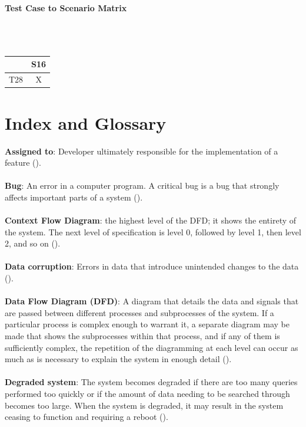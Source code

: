 \documentclass{article}
\begin{document}
\paragraph{Test Case to Scenario Matrix}~\\ \\
\begin{tabular}{ | c || c | }
\hline
    & S16  \\
\hline
\hline
T28 &  X  \\
\hline
\end{tabular}

\section{Index and Glossary}
\textbf{Assigned to}: Developer ultimately responsible for the implementation of a feature (\pageref{feature}).\\ \\
\textbf{Bug}: An error in a computer program. A critical bug is a bug that strongly affects important parts of a system (\pageref{bug}).\\ \\
\textbf{Context Flow Diagram}: the highest level of the DFD; it shows the entirety of the system. The next level of specification is level 0, followed by level 1, then level 2, and so on (\pageref{cfd}).\\ \\
\textbf{Data corruption}: Errors in data that introduce unintended changes to the data (\pageref{data_corruption}).\\ \\
\textbf{Data Flow Diagram (DFD)}: A diagram that details the data and signals that are passed between different processes and subprocesses of the system. If a particular process is complex enough to warrant it, a separate diagram may be made that shows the subprocesses within that process, and if any of them is sufficiently complex, the repetition of the diagramming at each level can occur as much as is necessary to explain the system in enough detail (\pageref{dfd}).\\ \\
\textbf{Degraded system}: The system becomes degraded if there are too many queries performed too quickly or if the amount of data needing to be searched through becomes too large. When the system is degraded, it may result in the system ceasing to function and requiring a reboot (\pageref{degrad_sys}).\\ \\
\end{document}
